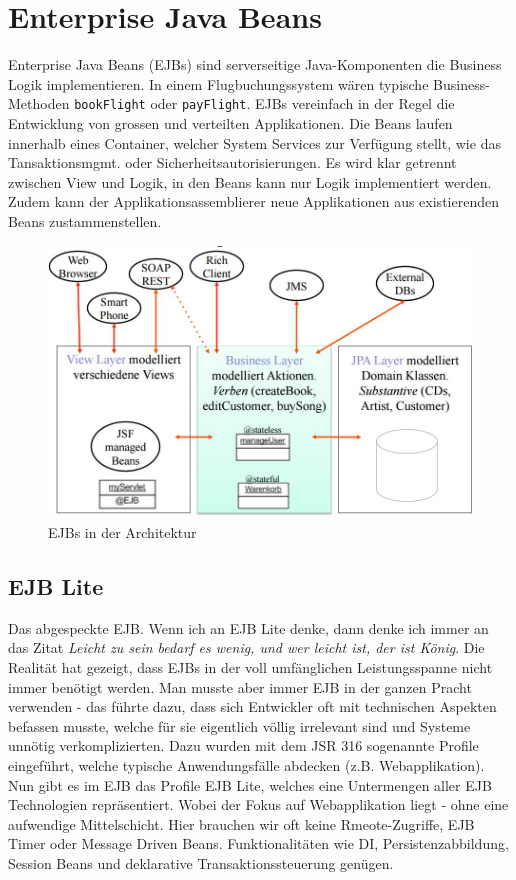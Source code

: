 \chapter{Enterprise Java Beans}
Enterprise Java Beans (EJBs) sind serverseitige Java-Komponenten die Business Logik implementieren. In einem Flugbuchungssystem wären typische Business-Methoden \verb|bookFlight| oder \verb|payFlight|. EJBs vereinfach in der Regel die Entwicklung von grossen und verteilten Applikationen. Die Beans laufen innerhalb eines Container, welcher System Services zur Verfügung stellt, wie das Tansaktionsmgmt. oder Sicherheitsautorisierungen. Es wird klar getrennt zwischen View und Logik, in den Beans kann nur Logik implementiert werden. Zudem kann der Applikationsassemblierer neue Applikationen aus existierenden Beans zustammenstellen.

\begin{figure}[h!]
	\centering
	\includegraphics[width=0.7\linewidth]{fig/ejb-layering}
	\caption{EJBs in der Architektur}
	\label{fig:ejb-layering}
\end{figure}

\section{EJB Lite}
Das abgespeckte EJB. Wenn ich an EJB Lite denke, dann denke ich immer an das Zitat \emph{Leicht zu sein bedarf es wenig, und wer leicht ist, der ist König}. Die Realität hat gezeigt, dass EJBs in der voll umfänglichen Leistungsspanne nicht immer benötigt werden. Man musste aber immer EJB in der ganzen Pracht verwenden - das führte dazu, dass sich Entwickler oft mit technischen Aspekten befassen musste, welche für sie eigentlich völlig irrelevant sind und Systeme unnötig verkomplizierten. Dazu wurden mit dem JSR 316 sogenannte Profile eingeführt, welche typische Anwendungsfälle abdecken (z.B. Webapplikation). Nun gibt es im EJB das Profile EJB Lite, welches eine Untermengen aller EJB Technologien repräsentiert. Wobei der Fokus auf Webapplikation liegt - ohne eine aufwendige Mittelschicht. Hier brauchen wir oft keine Rmeote-Zugriffe, EJB Timer oder Message Driven Beans. Funktionalitäten wie DI, Persistenzabbildung, Session Beans und deklarative Transaktionssteuerung genügen.

